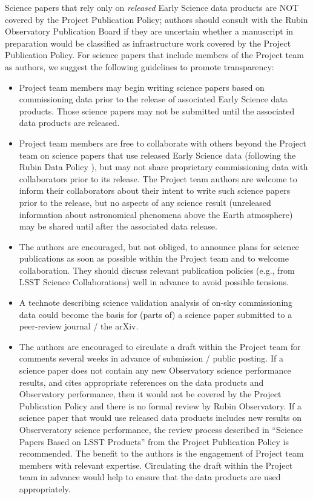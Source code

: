 \documentclass[SE,authoryear,toc]{lsstdoc}
\begin{document}
Science papers that rely only on \emph{released} Early Science data products are NOT covered by the Project Publication Policy; authors should consult with the Rubin Observatory Publication Board if they are uncertain whether a manuscript in preparation would be classified as infrastructure work covered by the Project Publication Policy.
For science papers that include members of the Project team as authors, we suggest the following guidelines to promote transparency:

\begin{itemize}

  \item Project team members may begin writing science papers based on commissioning data prior to the release of associated Early Science data products.
  Those science papers may not be submitted until the associated data products are released.

  \item Project team members are free to collaborate with others beyond the Project team on science papers that use released Early Science data (following the Rubin Data Policy ), but may not share proprietary commissioning data with collaborators prior to its release.
  The Project team authors are welcome to inform their collaborators about their intent to write such science papers prior to the release, but no aspects of any science result (unreleased information about astronomical phenomena above the Earth atmosphere) may be shared until after the associated data release.

  \item The authors are encouraged, but not obliged, to announce plans for science publications as soon as possible within the Project team and to welcome collaboration.
  They should discuss relevant publication policies (e.g., from LSST Science Collaborations) well in advance to avoid possible tensions.

  \item A technote describing science validation analysis of on-sky commissioning data could become the basis for (parts of) a science paper submitted to a peer-review journal / the arXiv.

  \item The authors are encouraged to circulate a draft within the Project team for comments several weeks in advance of submission / public posting.
  If a science paper does not contain any new Observatory science performance results, and cites appropriate references on the data products and Observatory performance, then it would not be covered by the Project Publication Policy and there is no formal review by Rubin Observatory.
  If a science paper that would use released data products includes new results on Observeratory science performance, the review process described in ``Science Papers Based on LSST Products'' from the Project Publication Policy  is recommended.
  The benefit to the authors is the engagement of Project team members with relevant expertise.
  Circulating the draft within the Project team in advance would help to ensure that the data products are used appropriately.


\end{itemize}
\end{document}
